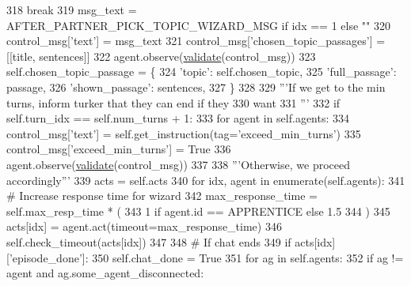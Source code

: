 \begin{DoxyCode}
318                                 \textcolor{keywordflow}{break}
319                     msg\_text = AFTER\_PARTNER\_PICK\_TOPIC\_WIZARD\_MSG \textcolor{keywordflow}{if} idx == 1 \textcolor{keywordflow}{else} \textcolor{stringliteral}{""}
320                     control\_msg[\textcolor{stringliteral}{'text'}] = msg\_text
321                     control\_msg[\textcolor{stringliteral}{'chosen\_topic\_passages'}] = [[title, sentences]]
322                     agent.observe(\hyperlink{namespaceparlai_1_1core_1_1worlds_afc3fad603b7bce41dbdc9cdc04a9c794}{validate}(control\_msg))
323                     self.chosen\_topic\_passage = \{
324                         \textcolor{stringliteral}{'topic'}: self.chosen\_topic,
325                         \textcolor{stringliteral}{'full\_passage'}: passage,
326                         \textcolor{stringliteral}{'shown\_passage'}: sentences,
327                     \}
328 
329         \textcolor{stringliteral}{'''If we get to the min turns, inform turker that they can end if they}
330 \textcolor{stringliteral}{           want}
331 \textcolor{stringliteral}{        '''}
332         \textcolor{keywordflow}{if} self.turn\_idx == self.num\_turns + 1:
333             \textcolor{keywordflow}{for} agent \textcolor{keywordflow}{in} self.agents:
334                 control\_msg[\textcolor{stringliteral}{'text'}] = self.get\_instruction(tag=\textcolor{stringliteral}{'exceed\_min\_turns'})
335                 control\_msg[\textcolor{stringliteral}{'exceed\_min\_turns'}] = \textcolor{keyword}{True}
336                 agent.observe(\hyperlink{namespaceparlai_1_1core_1_1worlds_afc3fad603b7bce41dbdc9cdc04a9c794}{validate}(control\_msg))
337 
338         \textcolor{stringliteral}{'''Otherwise, we proceed accordingly'''}
339         acts = self.acts
340         \textcolor{keywordflow}{for} idx, agent \textcolor{keywordflow}{in} enumerate(self.agents):
341             \textcolor{comment}{# Increase response time for wizard}
342             max\_response\_time = self.max\_resp\_time * (
343                 1 \textcolor{keywordflow}{if} agent.id == APPRENTICE \textcolor{keywordflow}{else} 1.5
344             )
345             acts[idx] = agent.act(timeout=max\_response\_time)
346             self.check\_timeout(acts[idx])
347 
348             \textcolor{comment}{# If chat ends}
349             \textcolor{keywordflow}{if} acts[idx][\textcolor{stringliteral}{'episode\_done'}]:
350                 self.chat\_done = \textcolor{keyword}{True}
351                 \textcolor{keywordflow}{for} ag \textcolor{keywordflow}{in} self.agents:
352                     \textcolor{keywordflow}{if} ag != agent \textcolor{keywordflow}{and} ag.some\_agent\_disconnected:

\end{DoxyCode}
